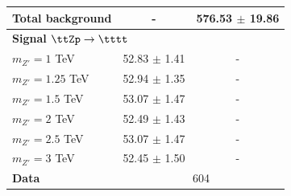 \documentclass[../thesis.tex]{subfiles}
\begin{document}
\begin{table}[!htb]
{\begin{tabular}{lcc}
      \midrule
      Total background		 	& -	& 576.53 $\pm$ 19.86 \\
      \midrule
      \multicolumn{3}{l}{\textbf{Signal $\ttZp \rightarrow \tttt$}} 	\\	
      $m_{Z'}=1$ TeV 			& 52.83 $\pm$ 1.41		& - \\
      $m_{Z'}=1.25$ TeV 		& 52.94 $\pm$ 1.35		& - \\
      $m_{Z'}=1.5$ TeV 			& 53.07 $\pm$ 1.47		& - \\
      $m_{Z'}=2$ TeV 			& 52.49 $\pm$ 1.43		& - \\ %
      $m_{Z'}=2.5$ TeV 			& 53.07 $\pm$ 1.47		& - \\
      $m_{Z'}=3$ TeV 			& 52.45 $\pm$ 1.50		& - \\
      \midrule
      \textbf{Data}				& \multicolumn{2}{c}{604} 		\\
      \midrule\bottomrule
    \end{tabular}
}
\end{table}
\end{document}
